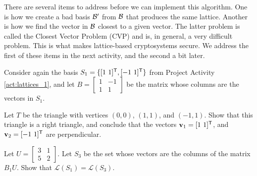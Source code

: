 There are several items to address before we can implement this algorithm. One is how we create a bad basis $\mathcal{B}'$ from $\mathcal{B}$ that produces the same lattice. Another is how we find the vector in $\mathcal{\mathcal{B}}$ closest to a given vector. The latter problem is called the Closest Vector Problem (CVP) and is, in general, a very difficult problem. This is what makes lattice-based cryptosystems secure. We address the first of these items in the next activity, and the second a bit later. 

 
\begin{pactivity} \label{act:lattices_2} Consider again the basis $S_1 = \{[1 \ 1]^{\tr}, [-1 \ 1]^{\tr}\}$ from Project Activity \ref{act:lattices_1}, and let $B = \left[ \begin{array}{cr} 1&-1\\1&1 \end{array} \right]$ be the matrix whose columns are the vectors in $S_1$. 
\ba
\item Let $T$ be the triangle with vertices $(0,0)$, $(1,1)$, and $(-1,1)$. Show that this triangle is a right triangle, and conclude that the vectors $\mathbf{v}_1 = [1 \ 1]^{\mathsf{T}}$, and $\mathbf{v}_2 = [-1 \ 1]^{\mathsf{T}}$ are perpendicular.


\item Let $U = \left[ \begin{array}{cc} 3&1\\5&2 \end{array} \right]$. Let $S_3$ be the set whose vectors are the columns of the matrix $B_1U$.  Show that $\mathcal{L}(S_1) = \mathcal{L}(S_3)$.

\ea

\end{pactivity}


